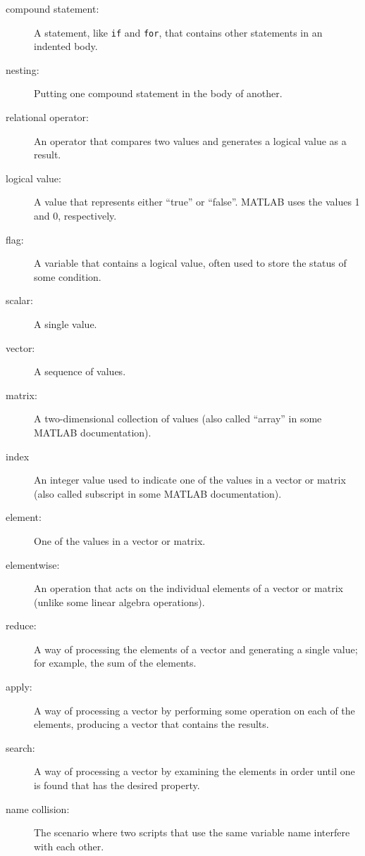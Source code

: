\begin{description}

\item[compound statement:] A statement, like {\tt if} and {\tt for}, that
contains other statements in an indented body.

\item[nesting:] Putting one compound statement in the body of another.

\item[relational operator:] An operator that compares two values and
generates a logical value as a result.

\item[logical value:] A value that represents either ``true'' or
``false''.  MATLAB uses the values 1 and 0, respectively.

\item[flag:] A variable that contains a logical value, often used
to store the status of some condition.

\item[scalar:] A single value.

\item[vector:] A sequence of values.

\item[matrix:] A two-dimensional collection of values (also called
``array'' in some MATLAB documentation).

\item[index] An integer value used to indicate one of the values
in a vector or matrix (also called subscript in some MATLAB documentation).

\item[element:] One of the values in a vector or matrix.

\item[elementwise:] An operation that acts on the individual elements
of a vector or matrix (unlike some linear algebra operations).

\item[reduce:] A way of processing the elements of a vector and
generating a single value; for example, the sum of the elements.

\item[apply:] A way of processing a vector by performing some operation
on each of the elements, producing a vector that contains the
results.

\item[search:] A way of processing a vector by examining the
elements in order until one is found that has the desired property.

\item[name collision:] The scenario where two scripts that use the
same variable name interfere with each other.

\end{description}

